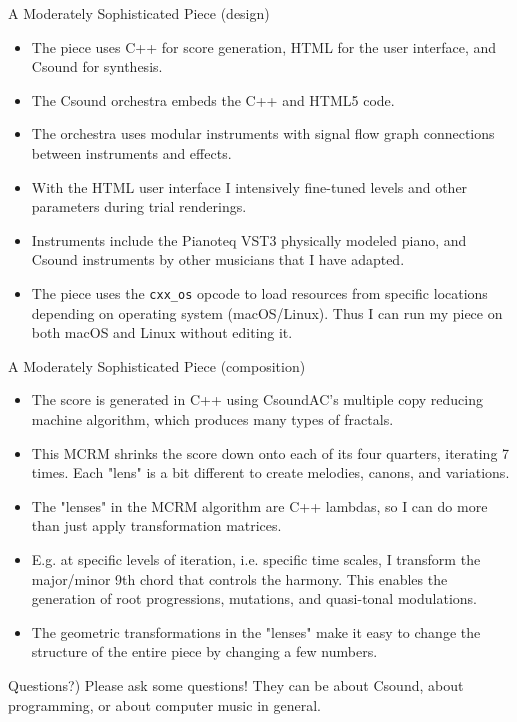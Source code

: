 \documentclass{beamer}
\begin{document}
\begin{frame}{A Moderately Sophisticated Piece (design)}
\begin{itemize}
\item The piece uses C++ for score generation, HTML for the user interface, and Csound for synthesis.
\item The Csound orchestra embeds the C++ and HTML5 code.
\item The orchestra uses modular instruments with signal flow graph connections between instruments and effects.
\item With the HTML user interface I intensively fine-tuned levels and other parameters during trial renderings.
\item Instruments include the Pianoteq VST3 physically modeled piano, and Csound instruments by other musicians that I have adapted.
\item The piece uses the \texttt{cxx\_os} opcode to load resources from specific locations depending on operating system (macOS/Linux). Thus I can run my piece on both macOS and Linux without editing it.
\end{itemize}
\end{frame}

\begin{frame}{A Moderately Sophisticated Piece (composition)}
\begin{itemize}
\item The score is generated in C++ using CsoundAC's multiple copy reducing machine algorithm, which produces many types of fractals.
\item This MCRM shrinks the score down onto each of its four quarters, iterating 7 times. Each "lens" is a bit different to create melodies, canons, and variations.
\item The "lenses" in the MCRM algorithm are C++ lambdas, so I can do more than just apply transformation matrices.
\item E.g. at specific levels of iteration, i.e.  specific time scales, I transform the major/minor 9th chord that controls the harmony. This enables the generation of root progressions, mutations, and quasi-tonal modulations.
\item The geometric transformations in the "lenses" make it easy to change the structure of the entire piece by changing a few numbers.
\end{itemize}
\end{frame}

\begin{frame}{Questions?)}
Please ask some questions! They can be about Csound, about programming, or about computer music in general.
\end{frame}
\end{document}
